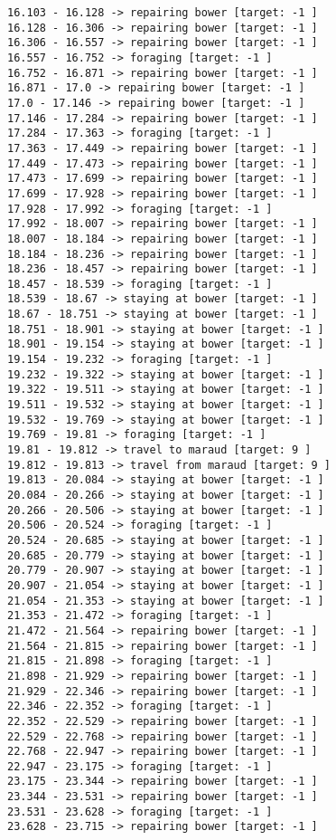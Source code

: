 \documentclass[11pt]{article}
\begin{document}
\begin{Verbatim}[commandchars=\\\{\}]
16.103 - 16.128 -> repairing bower [target: -1 ]
16.128 - 16.306 -> repairing bower [target: -1 ]
16.306 - 16.557 -> repairing bower [target: -1 ]
16.557 - 16.752 -> foraging [target: -1 ]
16.752 - 16.871 -> repairing bower [target: -1 ]
16.871 - 17.0 -> repairing bower [target: -1 ]
17.0 - 17.146 -> repairing bower [target: -1 ]
17.146 - 17.284 -> repairing bower [target: -1 ]
17.284 - 17.363 -> foraging [target: -1 ]
17.363 - 17.449 -> repairing bower [target: -1 ]
17.449 - 17.473 -> repairing bower [target: -1 ]
17.473 - 17.699 -> repairing bower [target: -1 ]
17.699 - 17.928 -> repairing bower [target: -1 ]
17.928 - 17.992 -> foraging [target: -1 ]
17.992 - 18.007 -> repairing bower [target: -1 ]
18.007 - 18.184 -> repairing bower [target: -1 ]
18.184 - 18.236 -> repairing bower [target: -1 ]
18.236 - 18.457 -> repairing bower [target: -1 ]
18.457 - 18.539 -> foraging [target: -1 ]
18.539 - 18.67 -> staying at bower [target: -1 ]
18.67 - 18.751 -> staying at bower [target: -1 ]
18.751 - 18.901 -> staying at bower [target: -1 ]
18.901 - 19.154 -> staying at bower [target: -1 ]
19.154 - 19.232 -> foraging [target: -1 ]
19.232 - 19.322 -> staying at bower [target: -1 ]
19.322 - 19.511 -> staying at bower [target: -1 ]
19.511 - 19.532 -> staying at bower [target: -1 ]
19.532 - 19.769 -> staying at bower [target: -1 ]
19.769 - 19.81 -> foraging [target: -1 ]
19.81 - 19.812 -> travel to maraud [target: 9 ]
19.812 - 19.813 -> travel from maraud [target: 9 ]
19.813 - 20.084 -> staying at bower [target: -1 ]
20.084 - 20.266 -> staying at bower [target: -1 ]
20.266 - 20.506 -> staying at bower [target: -1 ]
20.506 - 20.524 -> foraging [target: -1 ]
20.524 - 20.685 -> staying at bower [target: -1 ]
20.685 - 20.779 -> staying at bower [target: -1 ]
20.779 - 20.907 -> staying at bower [target: -1 ]
20.907 - 21.054 -> staying at bower [target: -1 ]
21.054 - 21.353 -> staying at bower [target: -1 ]
21.353 - 21.472 -> foraging [target: -1 ]
21.472 - 21.564 -> repairing bower [target: -1 ]
21.564 - 21.815 -> repairing bower [target: -1 ]
21.815 - 21.898 -> foraging [target: -1 ]
21.898 - 21.929 -> repairing bower [target: -1 ]
21.929 - 22.346 -> repairing bower [target: -1 ]
22.346 - 22.352 -> foraging [target: -1 ]
22.352 - 22.529 -> repairing bower [target: -1 ]
22.529 - 22.768 -> repairing bower [target: -1 ]
22.768 - 22.947 -> repairing bower [target: -1 ]
22.947 - 23.175 -> foraging [target: -1 ]
23.175 - 23.344 -> repairing bower [target: -1 ]
23.344 - 23.531 -> repairing bower [target: -1 ]
23.531 - 23.628 -> foraging [target: -1 ]
23.628 - 23.715 -> repairing bower [target: -1 ]

\end{Verbatim}
\end{document}
